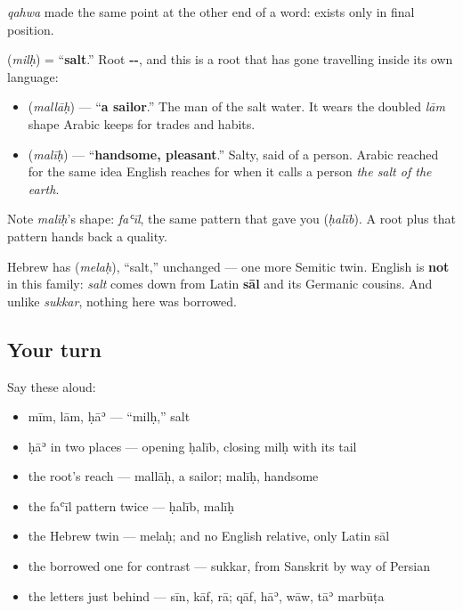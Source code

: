 \emph{qahwa} made the same point at the other end of a word: \textbf{} exists only in final position.

\begin{cousinweb}
\textbf{} (\emph{milḥ}) = \textquotedblleft{}\textbf{salt}.\textquotedblright{} Root \textbf{--}, and this is a root that has gone travelling inside its own language:

\begin{itemize}
\raggedright
  \item \textbf{} (\emph{mallāḥ}) — \textquotedblleft{}\textbf{a sailor}.\textquotedblright{} The man of the salt water. It wears the doubled \emph{lām} shape Arabic keeps for trades and habits.
  \item \textbf{} (\emph{malīḥ}) — \textquotedblleft{}\textbf{handsome, pleasant}.\textquotedblright{} Salty, said of a person. Arabic reached for the same idea English reaches for when it calls a person \emph{the salt of the earth}.
\end{itemize}

Note \emph{malīḥ}'s shape: \emph{faʿīl}, the same pattern that gave you \textbf{} (\emph{ḥalīb}). A root plus that pattern hands back a quality.

Hebrew has \textbf{} (\emph{melaḥ}), \textquotedblleft{}salt,\textquotedblright{} unchanged — one more Semitic twin. English is \textbf{not} in this family: \emph{salt} comes down from Latin \textbf{sāl} and its Germanic cousins. And unlike \emph{sukkar}, nothing here was borrowed.
\end{cousinweb}

\subsection*{Your turn}
Say these aloud:

\begin{itemize}
\raggedright
  \item mīm, lām, ḥāʾ — \textquotedblleft{}milḥ,\textquotedblright{} salt
  \item ḥāʾ in two places — opening ḥalīb, closing milḥ with its tail
  \item the root's reach — mallāḥ, a sailor; malīḥ, handsome
  \item the faʿīl pattern twice — ḥalīb, malīḥ
  \item the Hebrew twin — melaḥ; and no English relative, only Latin sāl
  \item the borrowed one for contrast — sukkar, from Sanskrit by way of Persian
  \item the letters just behind — sīn, kāf, rā; qāf, hāʾ, wāw, tāʾ marbūṭa
\end{itemize}

